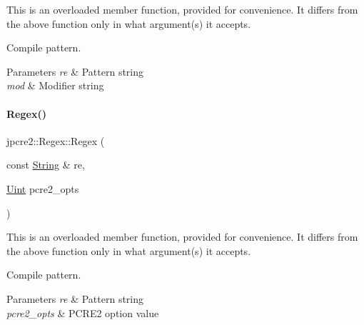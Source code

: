 This is an overloaded member function, provided for convenience. It differs from the above function only in what argument(s) it accepts. 

Compile pattern. 
\begin{DoxyParams}{Parameters}
{\em re} & Pattern string \\
\hline
{\em mod} & Modifier string \\
\hline
\end{DoxyParams}
\hypertarget{classjpcre2_1_1Regex_a8f8a1eabf09292b782a6f33287e3fee4_a8f8a1eabf09292b782a6f33287e3fee4}{}\label{classjpcre2_1_1Regex_a8f8a1eabf09292b782a6f33287e3fee4_a8f8a1eabf09292b782a6f33287e3fee4} 
\paragraph{\texorpdfstring{Regex()}{Regex()}\hspace{0.1cm}{\footnotesize\ttfamily [4/6]}}
{\footnotesize\ttfamily jpcre2\+::\+Regex\+::\+Regex (\begin{DoxyParamCaption}\item[{const \hyperlink{namespacejpcre2_a91f03070152fb228bc116c5a737f1d16}{String} \&}]{re,  }\item[{\hyperlink{namespacejpcre2_a078242d38221a13fb3543b9edd78c099}{Uint}}]{pcre2\+\_\+opts }\end{DoxyParamCaption})\hspace{0.3cm}{\ttfamily [inline]}}



This is an overloaded member function, provided for convenience. It differs from the above function only in what argument(s) it accepts. 

Compile pattern. 
\begin{DoxyParams}{Parameters}
{\em re} & Pattern string \\
\hline
{\em pcre2\+\_\+opts} & P\+C\+R\+E2 option value \\
\hline
\end{DoxyParams}
\hypertarget{classjpcre2_1_1Regex_abe210e2ca6cfcef11760875930cf069d_abe210e2ca6cfcef11760875930cf069d}{}\label{classjpcre2_1_1Regex_abe210e2ca6cfcef11760875930cf069d_abe210e2ca6cfcef11760875930cf069d} 

